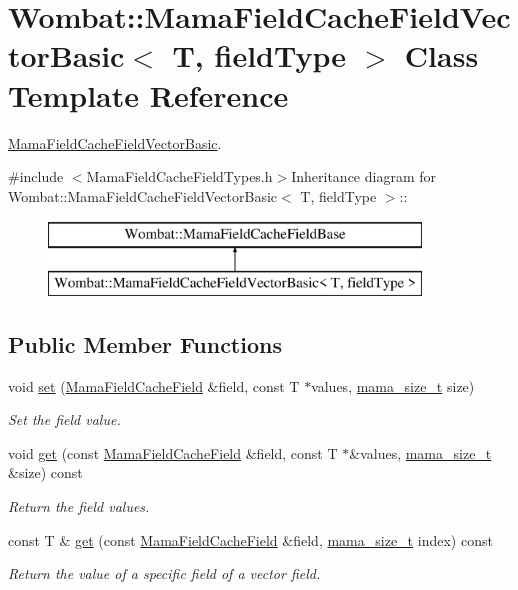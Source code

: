\hypertarget{classWombat_1_1MamaFieldCacheFieldVectorBasic}{
\section{Wombat::MamaFieldCacheFieldVectorBasic$<$ T, fieldType $>$ Class Template Reference}
\label{classWombat_1_1MamaFieldCacheFieldVectorBasic}
}


\hyperlink{classWombat_1_1MamaFieldCacheFieldVectorBasic}{MamaFieldCacheFieldVectorBasic}.  


{\ttfamily \#include $<$MamaFieldCacheFieldTypes.h$>$}Inheritance diagram for Wombat::MamaFieldCacheFieldVectorBasic$<$ T, fieldType $>$::\begin{figure}[H]
\begin{center}
\leavevmode
\includegraphics[height=2cm]{classWombat_1_1MamaFieldCacheFieldVectorBasic}
\end{center}
\end{figure}
\subsection*{Public Member Functions}
\begin{DoxyCompactItemize}
\item 
void \hyperlink{classWombat_1_1MamaFieldCacheFieldVectorBasic_a21c8322f02e29983948fbb406e027c58}{set} (\hyperlink{classWombat_1_1MamaFieldCacheField}{MamaFieldCacheField} \&field, const T $\ast$values, \hyperlink{classmama__size__t}{mama\_\-size\_\-t} size)
\begin{DoxyCompactList}\small\item\em Set the field value. \item\end{DoxyCompactList}\item 
void \hyperlink{classWombat_1_1MamaFieldCacheFieldVectorBasic_ac17d53c7e84ee822a8e6c506681aed7e}{get} (const \hyperlink{classWombat_1_1MamaFieldCacheField}{MamaFieldCacheField} \&field, const T $\ast$\&values, \hyperlink{classmama__size__t}{mama\_\-size\_\-t} \&size) const 
\begin{DoxyCompactList}\small\item\em Return the field values. \item\end{DoxyCompactList}\item 
const T \& \hyperlink{classWombat_1_1MamaFieldCacheFieldVectorBasic_a16801dab96e3ff299737db8b2a07acea}{get} (const \hyperlink{classWombat_1_1MamaFieldCacheField}{MamaFieldCacheField} \&field, \hyperlink{classmama__size__t}{mama\_\-size\_\-t} index) const 
\begin{DoxyCompactList}\small\item\em Return the value of a specific field of a vector field. \item\end{DoxyCompactList}\end{DoxyCompactItemize}
